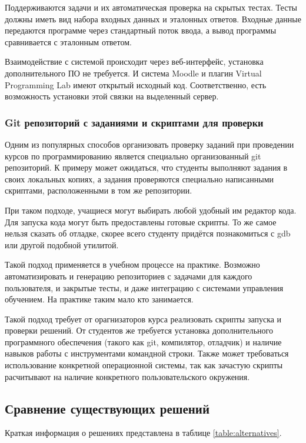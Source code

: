\documentclass[a4paper,article,14pt]{extarticle}
\begin{document}
Поддерживаются задачи и их автоматическая проверка на скрытых тестах. Тесты должны иметь вид набора входных данных и эталонных ответов. Входные данные передаются программе через стандартный поток ввода, а вывод программы сравнивается с эталонным ответом.

Взаимодействие с системой происходит через веб-интерфейс, установка дополнительного ПО не требуется. И система Moodle и плагин Virtual Programming Lab имеют открытый исходный код. Соответственно, есть возможность установки этой связки на выделенный сервер.

\subsubsection{Git репозиторий с заданиями и скриптами для проверки}

Одним из популярных способов организовать проверку заданий при проведении курсов по программированию является специально организованный git репозиторий. К примеру может ожидаться, что студенты выполняют задания в своих локальных копиях, а задания проверяются специально написанными скриптами, расположенными в том же репозитории.

При таком подходе, учащиеся могут выбирать любой удобный им редактор кода. Для запуска кода могут быть предоставлены готовые скрипты. То же самое нельзя сказать об отладке, скорее всего студенту придётся познакомиться с gdb или другой подобной утилитой.

Такой подход применяется в учебном процессе на практике. Возможно автоматизировать и генерацию репозиториев с задачами для каждого пользователя, и закрытые тесты, и даже интеграцию с системами управления обучением. На практике таким мало кто занимается.

Такой подход требует от орагнизаторов курса реализовать скрипты запуска и проверки решений. От студентов же требуется установка дополнительного программного обеспечения (такого как git, компилятор, отладчик) и наличие навыков работы с инструментами командной строки. Также может требоваться использование конкретной операционной системы, так как зачастую скрипты расчитывают на наличие конкретного пользовательского окружения.


\subsection{Сравнение существующих решений}

Краткая информация о решениях представлена в таблице \ref{table:alternatives}.
\end{document}
